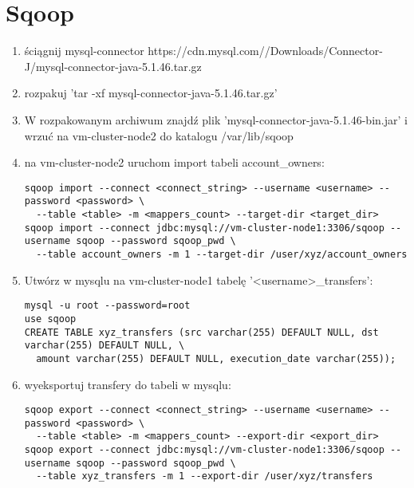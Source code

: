 \documentclass{article}
\begin{document}
\section*{Sqoop}

\begin{enumerate}
\item ściągnij mysql-connector https://cdn.mysql.com//Downloads/Connector-J/mysql-connector-java-5.1.46.tar.gz
\item rozpakuj 'tar -xf mysql-connector-java-5.1.46.tar.gz'
\item W rozpakowanym archiwum znajdź plik 'mysql-connector-java-5.1.46-bin.jar' i wrzuć na vm-cluster-node2 do katalogu /var/lib/sqoop
\item na vm-cluster-node2 uruchom import tabeli account\_owners:
\begin{lstlisting}
sqoop import --connect <connect_string> --username <username> --password <password> \
  --table <table> -m <mappers_count> --target-dir <target_dir>
sqoop import --connect jdbc:mysql://vm-cluster-node1:3306/sqoop --username sqoop --password sqoop_pwd \
  --table account_owners -m 1 --target-dir /user/xyz/account_owners
\end{lstlisting}
\item Utwórz w mysqlu na vm-cluster-node1 tabelę '<username>\_transfers':
\begin{lstlisting}
mysql -u root --password=root
use sqoop
CREATE TABLE xyz_transfers (src varchar(255) DEFAULT NULL, dst varchar(255) DEFAULT NULL, \
  amount varchar(255) DEFAULT NULL, execution_date varchar(255));
\end{lstlisting}
\item wyeksportuj transfery do tabeli w mysqlu:
\begin{lstlisting}
sqoop export --connect <connect_string> --username <username> --password <password> \
  --table <table> -m <mappers_count> --export-dir <export_dir>
sqoop export --connect jdbc:mysql://vm-cluster-node1:3306/sqoop --username sqoop --password sqoop_pwd \
  --table xyz_transfers -m 1 --export-dir /user/xyz/transfers
\end{lstlisting}
\end{enumerate}
\end{document}
